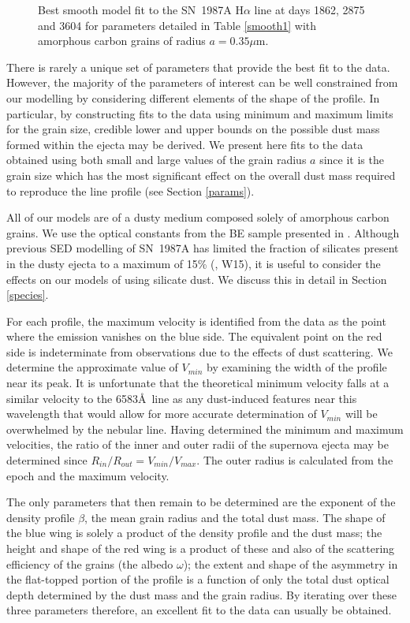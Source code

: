 \documentclass[useAMS,usenatbib,usegraphicx]{mnras}
\begin{document}
\begin{figure}
\begin{center}
\caption{Best smooth model fit to the SN~1987A H$\alpha$ line at days 1862, 2875 and 
3604 for parameters detailed in Table \ref{smooth1} with amorphous carbon grains of radius $a=0.35 \mu$m.}
\label{d1862_3604}
\end{center}
\end{figure}


There is rarely a unique set of parameters that provide the best fit to the data.  However, the 
majority of the parameters of interest can be well constrained from our 
modelling by considering different elements of the shape of the profile.  In particular, by constructing fits to 
the data using minimum and maximum limits for the grain 
size, credible lower and upper bounds on the possible dust mass formed 
within the ejecta may be derived.  We present here
 fits to the data obtained using both small and large values of the grain radius $a$ since it is the grain size which has the most significant effect on the overall 
dust mass required to reproduce the line profile (see Section \ref{params}).  

All of our models are of a dusty medium composed solely of amorphous carbon grains. We use the optical 
constants from the BE sample presented in \citet{Zubko1996}.    Although previous SED modelling of SN~1987A has limited the fraction of silicates present in the dusty ejecta to a maximum of 15\% (\citet{Ercolano2007}, W15), it is useful to consider the effects on our models of using silicate dust.  We discuss this in detail in Section \ref{species}.

For each profile, the maximum velocity is identified from the data as the 
point where the emission vanishes on the blue side.  The equivalent point on 
the red side is indeterminate from observations due to the effects of 
dust scattering.  We determine the approximate value of $V_{min}$ by examining the width of the profile near its peak. It is unfortunate that the theoretical minimum velocity falls at 
a similar velocity to the 6583\AA\ line as any dust-induced features near this wavelength that would allow for more accurate determination of $V_{min}$
 will be overwhelmed by the nebular line.  Having determined the minimum and maximum velocities, the ratio 
of the inner and outer radii of the supernova ejecta may be determined since 
$R_{in}/R_{out}=V_{min}/V_{max}$.  The outer radius is calculated from the 
epoch and the maximum velocity.

The only parameters that then remain to be determined are the exponent of 
the density profile $\beta$, the mean grain  radius and the total dust mass.  The shape 
of the blue wing is solely a product of the density profile and the dust 
mass; the height and shape of the red wing is a product of these and also 
of the scattering efficiency of the grains (the albedo $\omega$); the 
extent and shape of the asymmetry in the flat-topped portion of the 
profile is a function of only the total dust optical depth determined by the 
dust mass and the grain radius.  By iterating over these three parameters 
therefore, an excellent fit to the data can usually be obtained.
\end{document}
